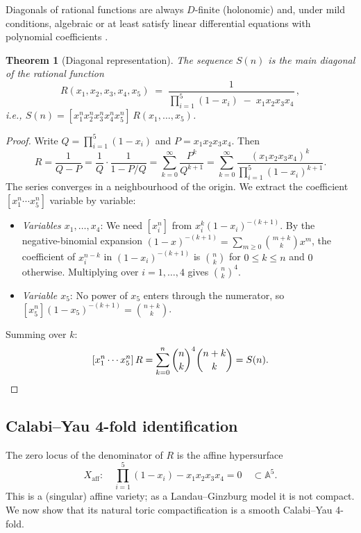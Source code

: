\documentclass[11pt, a4paper]{article}
\newtheorem{theorem}{Theorem}
\begin{document}
Diagonals of rational functions are always $D$-finite (holonomic) and, under
mild conditions, algebraic or at least satisfy linear differential equations
with polynomial coefficients \cite{LipshitzPoorten1990,Christol1986}.

\begin{theorem}[Diagonal representation]\label{thm:diagonal}
The sequence $S(n)$ is the main diagonal of the rational function
\begin{equation}\label{eq:R}
  R(x_1, x_2, x_3, x_4, x_5)
  \;=\; \frac{1}{\displaystyle\prod_{i=1}^5 (1-x_i) \;-\; x_1 x_2 x_3 x_4}\,,
\end{equation}
i.e., $S(n) = [x_1^n x_2^n x_3^n x_4^n x_5^n]\, R(x_1,\dots,x_5)$.
\end{theorem}

\begin{proof}
Write $Q = \prod_{i=1}^5(1-x_i)$ and $P = x_1x_2x_3x_4$.  Then
\[
  R = \frac{1}{Q-P} = \frac{1}{Q}\cdot\frac{1}{1-P/Q}
    = \sum_{k=0}^\infty \frac{P^k}{Q^{k+1}}
    = \sum_{k=0}^\infty
        \frac{(x_1x_2x_3x_4)^k}{\displaystyle\prod_{i=1}^5(1-x_i)^{k+1}}.
\]
The series converges in a neighbourhood of the origin.  We extract the
coefficient $[x_1^n\cdots x_5^n]$ variable by variable:
\begin{itemize}
    \item \textit{Variables $x_1,\dots,x_4$}: We need $[x_i^n]$ from
          $x_i^k(1-x_i)^{-(k+1)}$.  By the negative-binomial expansion
          $(1-x)^{-(k+1)}=\sum_{m\ge 0}\binom{m+k}{k}x^m$, the coefficient
          of $x_i^{n-k}$ in $(1-x_i)^{-(k+1)}$ is $\binom{n}{k}$ for
          $0\le k\le n$ and $0$ otherwise.  Multiplying over $i=1,\dots,4$
          gives $\binom{n}{k}^4$.
    \item \textit{Variable $x_5$}: No power of $x_5$ enters through the
          numerator, so $[x_5^n](1-x_5)^{-(k+1)} = \binom{n+k}{k}$.
\end{itemize}
Summing over $k$:
\[
  [x_1^n\cdots x_5^n]\,R
  = \sum_{k=0}^n \binom{n}{k}^4\binom{n+k}{k} = S(n).\qedhere
\]
\end{proof}

\subsection{Calabi--Yau 4-fold identification}

The zero locus of the denominator of $R$ is the affine hypersurface
\begin{equation}\label{eq:LG}
  X_{\mathrm{aff}}:\quad
  \prod_{i=1}^5(1-x_i) - x_1x_2x_3x_4 = 0
  \quad \subset \mathbb{A}^5.
\end{equation}
This is a (singular) affine variety; as a Landau--Ginzburg model it is
not compact.  We now show that its natural toric compactification is a
smooth Calabi--Yau 4-fold.
\end{document}
